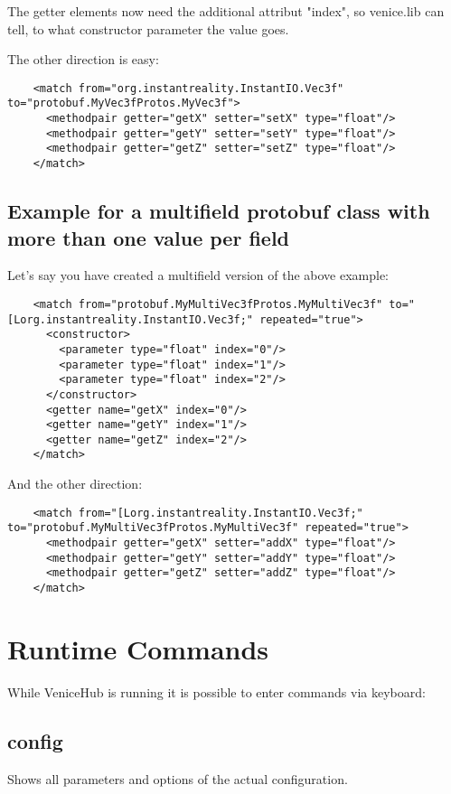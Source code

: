 \documentclass[german,a4paper]{article}
\begin{document}
The getter elements now need the additional attribut "index", so venice.lib can tell, to what constructor parameter the value goes.

The other direction is easy:
\begin{lstlisting}
    <match from="org.instantreality.InstantIO.Vec3f" to="protobuf.MyVec3fProtos.MyVec3f">
      <methodpair getter="getX" setter="setX" type="float"/>
      <methodpair getter="getY" setter="setY" type="float"/>
      <methodpair getter="getZ" setter="setZ" type="float"/>
    </match>
\end{lstlisting}


\subsection{Example for a multifield protobuf class with more than one value per field}

Let's say you have created a multifield version of the above example:
\begin{lstlisting}
    <match from="protobuf.MyMultiVec3fProtos.MyMultiVec3f" to="[Lorg.instantreality.InstantIO.Vec3f;" repeated="true">
      <constructor>
        <parameter type="float" index="0"/>
        <parameter type="float" index="1"/>
        <parameter type="float" index="2"/>
      </constructor>
      <getter name="getX" index="0"/>
      <getter name="getY" index="1"/>
      <getter name="getZ" index="2"/>
    </match>
\end{lstlisting}
And the other direction:
\begin{lstlisting}
    <match from="[Lorg.instantreality.InstantIO.Vec3f;" to="protobuf.MyMultiVec3fProtos.MyMultiVec3f" repeated="true">
      <methodpair getter="getX" setter="addX" type="float"/>
      <methodpair getter="getY" setter="addY" type="float"/>
      <methodpair getter="getZ" setter="addZ" type="float"/>
    </match>
\end{lstlisting}


\section{Runtime Commands}

While VeniceHub is running it is possible to enter commands via keyboard:\\

\subsection{config}
Shows all parameters and options of the actual configuration.
\end{document}
